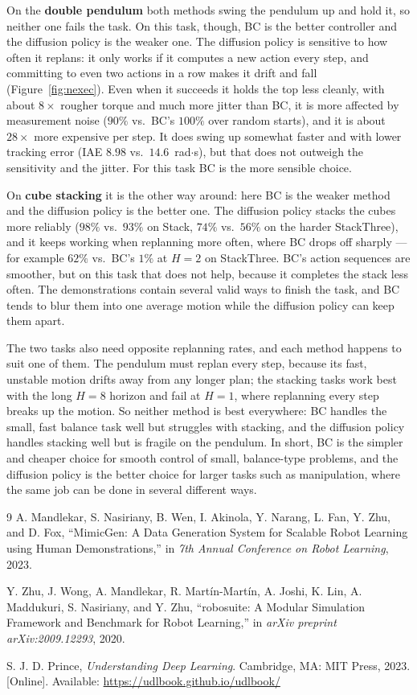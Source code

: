 \documentclass[11pt,a4paper]{article}
\begin{document}
On the \textbf{double pendulum} both methods swing the pendulum up and hold it, so
neither one fails the task. On this task, though, BC is the better controller and the
diffusion policy is the weaker one. The diffusion policy is sensitive to how often it
replans: it only works if it computes a new action every step, and committing to even
two actions in a row makes it drift and fall (Figure~\ref{fig:nexec}). Even when it
succeeds it holds the top less cleanly, with about $8\times$ rougher torque and much
more jitter than BC, it is more affected by measurement noise ($90\%$ vs.\ BC's
$100\%$ over random starts), and it is about $28\times$ more expensive per step. It
does swing up somewhat faster and with lower tracking error (IAE $8.98$ vs.\
$14.6$~rad$\cdot$s), but that does not outweigh the sensitivity and the jitter. For
this task BC is the more sensible choice.

On \textbf{cube stacking} it is the other way around: here BC is the weaker method and
the diffusion policy is the better one. The diffusion policy stacks the cubes more
reliably ($98\%$ vs.\ $93\%$ on Stack, $74\%$ vs.\ $56\%$ on the harder StackThree),
and it keeps working when replanning more often, where BC drops off sharply --- for
example $62\%$ vs.\ BC's $1\%$ at $H=2$ on StackThree. BC's action sequences are
smoother, but on this task that does not help, because it completes the stack less
often. The demonstrations contain several valid ways to finish the task, and BC tends
to blur them into one average motion while the diffusion policy can keep them apart.

The two tasks also need opposite replanning rates, and each method happens to suit
one of them. The pendulum must replan every step, because its fast, unstable motion
drifts away from any longer plan; the stacking tasks work best with the long $H=8$
horizon and fail at $H=1$, where replanning every step breaks up the motion. So
neither method is best everywhere: BC handles the small, fast balance task well but
struggles with stacking, and the diffusion policy handles stacking well but is fragile
on the pendulum. In short, BC is the simpler and cheaper choice for smooth control of
small, balance-type problems, and the diffusion policy is the better choice for larger
tasks such as manipulation, where the same job can be done in several different ways.

\clearpage
\begin{thebibliography}{9}
A. Mandlekar, S. Nasiriany, B. Wen, I. Akinola, Y. Narang, L. Fan, Y. Zhu, and D. Fox, ``MimicGen: A Data Generation System for Scalable Robot Learning using Human Demonstrations,'' in \emph{7th Annual Conference on Robot Learning}, 2023.

Y. Zhu, J. Wong, A. Mandlekar, R. Mart\'{i}n-Mart\'{i}n, A. Joshi, K. Lin, A. Maddukuri, S. Nasiriany, and Y. Zhu, ``robosuite: A Modular Simulation Framework and Benchmark for Robot Learning,'' in \emph{arXiv preprint arXiv:2009.12293}, 2020.

S. J. D. Prince, \emph{Understanding Deep Learning}. Cambridge, MA: MIT Press, 2023. [Online]. Available: \url{https://udlbook.github.io/udlbook/}
\end{thebibliography}
\end{document}
